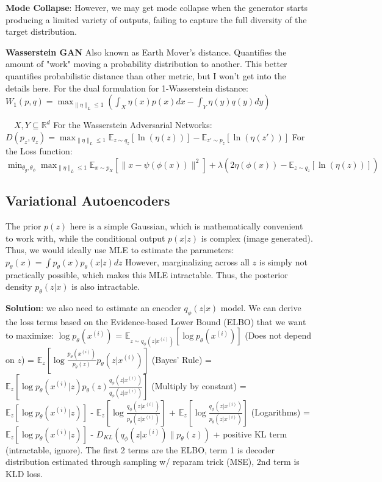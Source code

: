 \textbf{Mode Collapse}: However, we may get mode collapse when the generator starts producing a limited variety of outputs, failing to capture the full diversity of the target distribution. 

\textbf{Wasserstein GAN}
Also known as Earth Mover's distance. Quantifies the amount of "work" moving a probability distribution to another. This better quantifies probabilistic distance than other metric, but I won't get into the details here. 
For the dual formulation for 1-Wasserstein distance:
$W_1(p, q) = \max_{\|\eta\|_L \leq 1} \left( \int_X \eta(x)p(x)dx - \int_Y \eta(y)q(y)dy \right)$

$\quad X, Y \subseteq \mathbb{R}^d$
For the Wasserstein Adversarial Networks:
$
D(p_z, q_z) = \max_{\|\eta\|_L \leq 1} \mathbb{E}_{z\sim q_z}[\ln(\eta(z))] - \mathbb{E}_{z'\sim p_z}[\ln(\eta(z'))]
$
For the Loss function:
$
\min_{\theta_g,\theta_\phi} \max_{\|\eta\|_L \leq 1} \mathbb{E}_{x\sim p_X}[\|x - \psi(\phi(x))\|^2] + \lambda \left( 2\eta(\phi(x)) - \mathbb{E}_{z\sim q_z}[\ln(\eta(z))] \right)
$

\subsection*{Variational Autoencoders}
The prior $p(z)$ here is a simple Gaussian, which is mathematically convenient to work with, while the conditional output $p(x|z)$ is complex (image generated). Thus, we would ideally use MLE to estimate the parameters: 
$p_{\theta}(x) = \int p_{\theta}(x)p_{\theta}(x|z)dz$
However, marginalizing across all $z$ is simply not practically possible, which makes this MLE intractable. Thus, the posterior density $p_{\theta}(z|x)$ is also intractable. 

\textbf{Solution}: we also need to estimate an encoder $q_{\phi}(z|x)$ model. We can derive the loss terms based on the Evidence-based Lower Bound (ELBO) that we want to maximize: 
$\log p_{\theta}(x^{(i)})$ = $\mathbb{E}_{z \sim q_{\phi}(z|x^{(i)})}\left[\log p_{\theta}(x^{(i)})\right]$ (Does not depend on \( z \))
= $\mathbb{E}_{z}\left[\log \frac{p_{\theta}(x^{(i)})}{p_{\theta}(z)} p_{\theta}(z | x^{(i)})\right]$ (Bayes' Rule)
= $\mathbb{E}_{z}\left[\log p_{\theta}(x^{(i)} | z) p_{\theta}(z) \frac{q_{\phi}(z | x^{(i)})}{q_{\phi}(z | x^{(i)})}\right]$ (Multiply by constant)
= $\mathbb{E}_{z}\left[\log p_{\theta}(x^{(i)} | z)\right]$ - $\mathbb{E}_{z}\left[\log \frac{q_{\phi}(z | x^{(i)})}{p_{\theta}(z | x^{(i)})}\right]$ + $\mathbb{E}_{z}\left[\log \frac{q_{\phi}(z | x^{(i)})}{p_{\theta}(z | x^{(i)})}\right]$ (Logarithms)
= $\mathbb{E}_{z}\left[\log p_{\theta}(x^{(i)} | z)\right]$ - $D_{KL}\left(q_{\phi}(z | x^{(i)}) \| p_{\theta}(z)\right)$ + positive KL term (intractable, ignore). The first 2 terms are the ELBO, term 1 is decoder distribution estimated through sampling w/ reparam trick (MSE), 
2nd term is KLD loss.  



